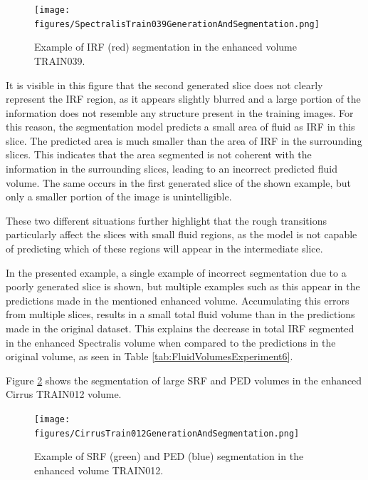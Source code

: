 \begin{figure}[h!]
	\centering	\texttt{[image: figures/SpectralisTrain039GenerationAndSegmentation.png]}
	\caption{Example of IRF (red) segmentation in the enhanced volume TRAIN039.}
	\label{fig:SpectralisTrain039GenerationAndSegmentation}
\end{figure}

It is visible in this figure that the second generated slice does not clearly represent the IRF region, as it appears slightly blurred and a large portion of the information does not resemble any structure present in the training images. For this reason, the segmentation model predicts a small area of fluid as IRF in this slice. The predicted area is much smaller than the area of IRF in the surrounding slices. This indicates that the area segmented is not coherent with the information in the surrounding slices, leading to an incorrect predicted fluid volume. The same occurs in the first generated slice of the shown example, but only a smaller portion of the image is unintelligible. 
\par
These two different situations further highlight that the rough transitions particularly affect the slices with small fluid regions, as the model is not capable of predicting which of these regions will appear in the intermediate slice.
\par
In the presented example, a single example of incorrect segmentation due to a poorly generated slice is shown, but multiple examples such as this appear in the predictions made in the mentioned enhanced volume. Accumulating this errors from multiple slices, results in a small total fluid volume than in the predictions made in the original dataset. This explains the decrease in total IRF segmented in the enhanced Spectralis volume when compared to the predictions in the original volume, as seen in Table \ref{tab:FluidVolumesExperiment6}.
\par
Figure \ref{fig:CirrusTrain012GenerationAndSegmentation} shows the segmentation of large SRF and PED volumes in the enhanced Cirrus TRAIN012 volume.

\begin{figure}[!ht]
	\centering	\texttt{[image: figures/CirrusTrain012GenerationAndSegmentation.png]}
	\caption{Example of SRF (green) and PED (blue) segmentation in the enhanced volume TRAIN012.}
	\label{fig:CirrusTrain012GenerationAndSegmentation}
\end{figure}

